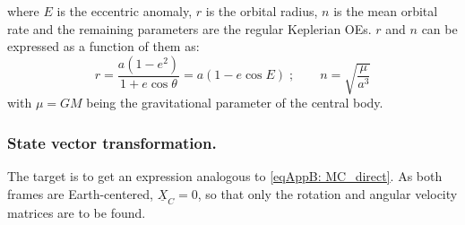		\noindent where $E$ is the eccentric anomaly, $r$ is the orbital radius, $n$ is the mean orbital rate and the remaining parameters are the regular Keplerian OEs. $r$ and $n$ can be expressed as a function of them as:
		\[
		r = \dfrac{a (1 - e^2)}{1 + e \cos\theta} = a (1 - e\cos E) \; ; \qquad n = \sqrt{\dfrac{\mu }{a^3}}		
		\]
		\noindent with $\mu = GM$ being the gravitational parameter of the central body.
		\subsubsection{State vector transformation.}
		\indent The target is to get an expression analogous to \eqref{eqAppB: 	MC_direct}. As both frames are Earth-centered, $\underline{X}_C = 0$, so that only the rotation and angular velocity matrices are to be found.
